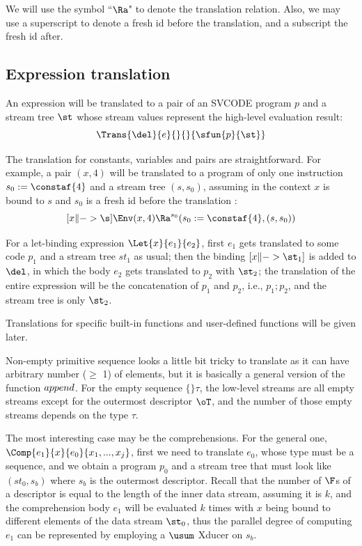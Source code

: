 We will use the symbol ``$\Ra$" to denote the translation relation. 
Also, we may use a superscript to denote a fresh id before the translation, and a subscript the fresh id after.

\subsection{Expression translation}


An \mysnesl expression will be translated to a pair of an SVCODE program $p$ and a stream tree $\st$ whose stream values represent the high-level evaluation result:
$$ \Trans{\del}{e}{}{}{\sfun{p}{\st}}$$

The translation for constants, variables and pairs are straightforward. For example, a pair $(x,4)$ will be translated to a program of only one instruction $s_0 := \constaf{4}$ and a stream tree $(s,s_0)$, assuming in the context $x$ is bound to $s$ and $s_0$ is a fresh id before the translation :   
$$[x \|-> \s] \Env (x,4)  \Ra^{s_0} (s_0 := \constaf{4}, (s,s_0))$$ 

For a let-binding expression $\Let{x}{e_1}{e_2}$,  first $e_1$ gets translated to some code $p_1$ and a stream tree $st_1$ as usual; then the binding $[x \|-> \st_1]$ is added to $\del$, in which the body $e_2$ gets translated to $p_2$ with $\st_2$; the translation of the entire expression will be the concatenation of $p_1$ and $p_2$, i.e., $p_1;p_2$, and the stream tree is only $\st_2$.

Translations for specific built-in functions and user-defined functions will be given later.

Non-empty primitive sequence looks a little bit tricky to translate as it can have arbitrary  number ($\ge$ 1) of elements, but it is basically a general version of the function $\*{append}$.
For the empty sequence $\{\}\tau$, the low-level streams are all empty streams except for the outermost descriptor $\oT$, and the number of those empty streams depends on the type $\tau$.

The most interesting case may be the comprehensions. 
For the general one, $\Comp{e_1}{x}{e_0}{x_1,...,x_j}$, first we need to translate $e_0$, whose type must be a sequence, and we obtain a program $p_0$ and a stream tree that must look like $(st_0,s_b)$ where $s_b$ is the outermost descriptor. 
Recall that the number of $\F$s of a descriptor is equal to the length of the inner data stream, assuming it is $k$,  and the comprehension body $e_1$ will be evaluated $k$ times with $x$ being bound to different elements of the data stream $\st_0$, 
thus the parallel degree of computing $e_1$ can be represented by employing a $\usum$ Xducer on $s_b$.

